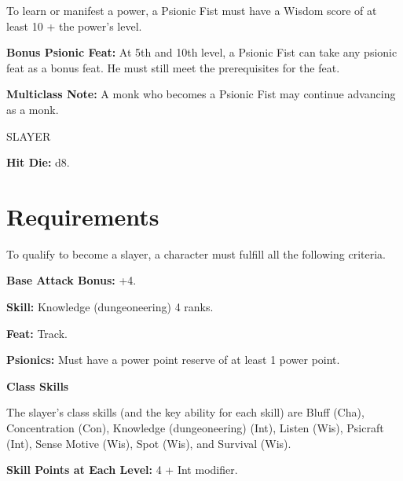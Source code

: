 \documentclass{article}
\begin{document}
To learn or manifest a power, a Psionic Fist must have a Wisdom score of at least 
10 + the power's level.

\textbf{Bonus Psionic Feat:} At 5th and 10th level, a Psionic Fist can take any 
psionic feat as a bonus feat. He must still meet the prerequisites for the feat.

\textbf{Multiclass Note:} A monk who becomes a Psionic Fist may continue advancing 
as a monk.

\vspace{12pt}
{\LARGE{}SLAYER}

\textbf{Hit Die:} d8.

\vspace{12pt}
\section*{\textbf{Requirements}}

To qualify to become a slayer, a character must fulfill all the following criteria.

\textbf{Base Attack Bonus:} +4.

\textbf{Skill:} Knowledge (dungeoneering) 4 ranks.

\textbf{Feat:} Track.

\textbf{Psionics:} Must have a power point reserve of at least 1 power point.

\vspace{12pt}
\textbf{Class Skills}

The slayer's class skills (and the key ability for each skill) are Bluff (Cha), 
Concentration (Con), Knowledge (dungeoneering) (Int), Listen (Wis), Psicraft (Int), 
Sense Motive (Wis), Spot (Wis), and Survival (Wis). 

\textbf{Skill Points at Each Level:} 4 + Int modifier.
\end{document}
